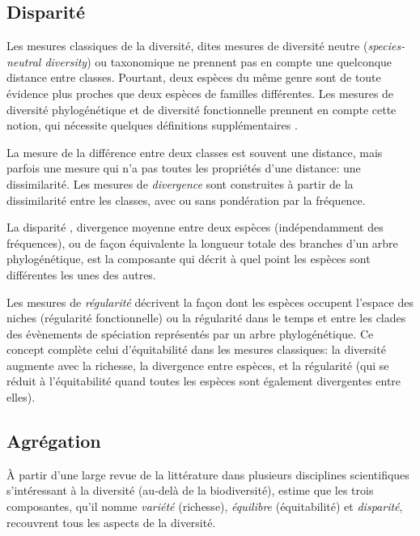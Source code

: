\documentclass[
  11pt,
  french,
  a4paper,
  extrafontsizes,onecolumn,openright
  ]{memoir}
\newlength{\rf}
\begin{document}
\hypertarget{disparituxe9}{%
\subsection{Disparité}\label{disparituxe9}}

Les mesures classiques de la diversité, dites mesures de diversité neutre (\emph{species-neutral diversity}) ou taxonomique ne prennent pas en compte une quelconque distance entre classes.
Pourtant, deux espèces du même genre sont de toute évidence plus proches que deux espèces de familles différentes.
Les mesures de diversité phylogénétique et de diversité fonctionnelle prennent en compte cette notion, qui nécessite quelques définitions supplémentaires \autocite{Mouillot2005,Ricotta2007}.

La mesure de la différence entre deux classes est souvent une distance, mais parfois une mesure qui n'a pas toutes les propriétés d'une distance: une dissimilarité.
Les mesures de \emph{divergence} \autocite{Pavoine2011} sont construites à partir de la dissimilarité entre les classes, avec ou sans pondération par la fréquence.

La disparité \autocite{Runnegar1987}, divergence moyenne entre deux espèces (indépendamment des fréquences), ou de façon équivalente la longueur totale des branches d'un arbre phylogénétique, est la composante qui décrit à quel point les espèces sont différentes les unes des autres.

Les mesures de \emph{régularité} décrivent la façon dont les espèces occupent l'espace des niches (régularité fonctionnelle) ou la régularité dans le temps et entre les clades des évènements de spéciation représentés par un arbre phylogénétique.
Ce concept complète celui d'équitabilité dans les mesures classiques: la diversité augmente avec la richesse, la divergence entre espèces, et la régularité (qui se réduit à l'équitabilité quand toutes les espèces sont également divergentes entre elles).

\hypertarget{agruxe9gation}{%
\subsection{Agrégation}\label{agruxe9gation}}

À partir d'une large revue de la littérature dans plusieurs disciplines scientifiques s'intéressant à la diversité (au-delà de la biodiversité), \textcite{Stirling2007} estime que les trois composantes, qu'il nomme \emph{variété} (richesse), \emph{équilibre} (équitabilité) et \emph{disparité}, recouvrent tous les aspects de la diversité.
\end{document}
